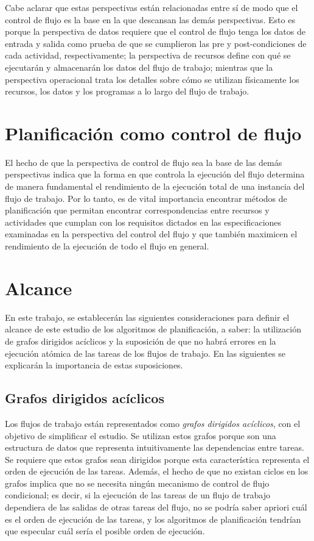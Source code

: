 Cabe aclarar que estas perspectivas están relacionadas entre sí de modo que el control de flujo es la base en la que descansan las demás perspectivas. Esto es porque la perspectiva de datos requiere que el control de flujo tenga los datos de entrada y salida como prueba de que se cumplieron las pre y post-condiciones de cada actividad, respectivamente; la perspectiva de recursos define con qué se ejecutarán y almacenarán los datos del flujo de trabajo; mientras que la perspectiva operacional trata los detalles sobre cómo se utilizan físicamente los recursos, los datos y los programas a lo largo del flujo de trabajo.


\section{Planificación como control de flujo}

El hecho de que la perspectiva de control de flujo sea la base de las demás perspectivas indica que la forma en que controla la ejecución del flujo determina de manera fundamental el rendimiento de la ejecución total de una instancia del flujo de trabajo. Por lo tanto, es de vital importancia encontrar métodos de planificación que permitan encontrar correspondencias entre recursos y actividades que cumplan con los requisitos dictados en las especificaciones examinadas en la perspectiva del control del flujo y que también maximicen el rendimiento de la ejecución de todo el flujo en general.

\section{Alcance}

En este trabajo, se establecerán las siguientes consideraciones para definir el alcance de este estudio de los algoritmos de planificación, a saber: la utilización de grafos dirigidos acíclicos y la suposición de que no habrá errores en la ejecución atómica de las tareas de los flujos de trabajo. En las siguientes se explicarán la importancia de estas suposiciones.

\subsection{Grafos dirigidos acíclicos}
Los flujos de trabajo están representados como \emph{grafos dirigidos acíclicos}, con el objetivo de simplificar el estudio. Se utilizan estos grafos porque son una estructura de datos que representa intuitivamente las dependencias entre tareas. Se requiere que estos grafos sean dirigidos porque esta característica representa el orden de ejecución de las tareas. Además, el hecho de que no existan ciclos en los grafos implica que no se necesita ningún mecanismo de control de flujo condicional; es decir, si la ejecución de las tareas de un flujo de trabajo dependiera de las salidas de otras tareas del flujo, no se podría saber apriori cuál es el orden de ejecución de las tareas, y los algoritmos de planificación tendrían que especular cuál sería el posible orden de ejecución.

